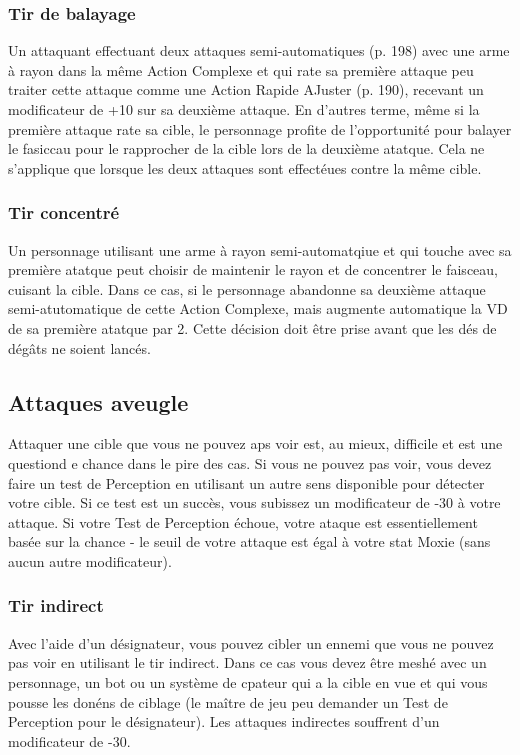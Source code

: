 \subsubsection{Tir de balayage} 

Un attaquant effectuant deux attaques semi-automatiques (p. 198) avec une arme à rayon dans la même Action Complexe et qui rate sa première attaque peu traiter cette attaque comme une Action Rapide AJuster (p. 190), recevant un modificateur de +10 sur sa deuxième attaque. En d'autres terme, même si la première attaque rate sa cible, le personnage profite de l'opportunité pour balayer le fasiccau pour le rapprocher de la cible lors de la deuxième atatque. Cela ne s'applique que lorsque les deux attaques sont effectéues contre la même cible. 

\subsubsection{Tir concentré} 

Un personnage utilisant une arme à rayon semi-automatqiue et qui touche avec sa première atatque peut choisir de maintenir le rayon et de concentrer le faisceau, cuisant la cible. Dans ce cas, si le personnage abandonne sa deuxième attaque semi-atutomatique de cette Action Complexe, mais augmente automatique la VD de sa première atatque par 2. Cette décision doit être prise avant que les dés de dégâts ne soient lancés. 

\subsection{Attaques aveugle} \label{sec:blind-attacks} 

Attaquer une cible que vous ne pouvez aps voir est, au mieux, difficile et est une questiond e chance dans le pire des cas. Si vous ne pouvez pas voir, vous devez faire un test de Perception en utilisant un autre sens disponible pour détecter votre cible. Si ce test est un succès, vous subissez un modificateur de -30 à votre attaque. Si votre Test de Perception échoue, votre ataque est essentiellement basée sur la chance - le seuil de votre attaque est égal à votre stat Moxie (sans aucun autre modificateur). 

\subsubsection{Tir indirect} 

Avec l'aide d'un désignateur, vous pouvez cibler un ennemi que vous ne pouvez pas voir en utilisant le tir indirect. Dans ce cas vous devez être meshé avec un personnage, un bot ou un système de cpateur qui a la cible en vue et qui vous pousse les donéns de ciblage (le maître de jeu peu demander un Test de Perception pour le désignateur). Les attaques indirectes souffrent d'un modificateur de -30. 

